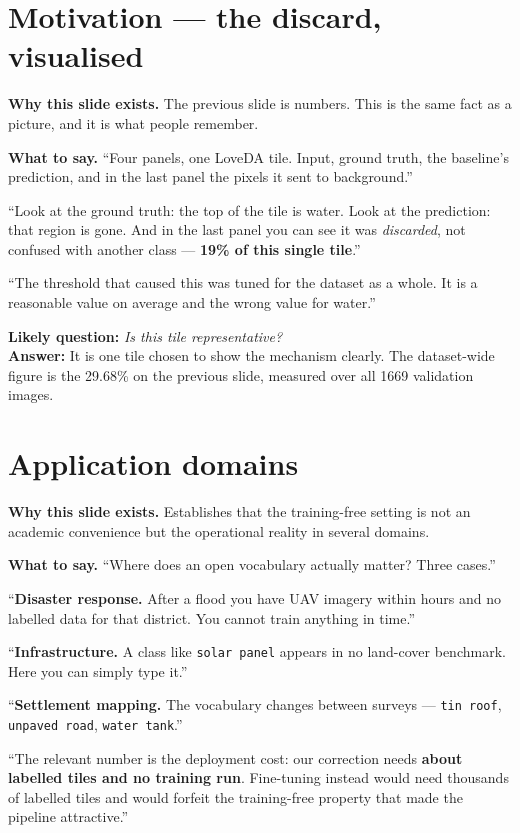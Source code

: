 \documentclass[11pt,a4paper]{article}
\newcommand{\best}[1]{\textcolor{acc}{\textbf{#1}}}
\newcommand{\why}[1]{\par\smallskip\noindent\textbf{Why this slide exists.} #1}
\newcommand{\say}[1]{\par\smallskip\noindent\textbf{What to say.} #1}
\newcommand{\ask}[2]{\par\smallskip\noindent\textbf{Likely question:} \emph{#1}\\
  \textbf{Answer:} #2}
\begin{document}
\section{Motivation --- the discard, visualised}
\why{The previous slide is numbers. This is the same fact as a picture, and it is
what people remember.}

\say{``Four panels, one LoveDA tile. Input, ground truth, the baseline's
prediction, and in the last panel the pixels it sent to background.''

\smallskip
``Look at the ground truth: the top of the tile is water. Look at the
prediction: that region is gone. And in the last panel you can see it was
\emph{discarded}, not confused with another class --- \best{19\% of this single
tile}.''

\smallskip
``The threshold that caused this was tuned for the dataset as a whole. It is a
reasonable value on average and the wrong value for water.''}

\ask{Is this tile representative?}{It is one tile chosen to show the mechanism
clearly. The dataset-wide figure is the 29.68\% on the previous slide, measured
over all 1669 validation images.}

\section{Application domains}
\why{Establishes that the training-free setting is not an academic convenience
but the operational reality in several domains.}

\say{``Where does an open vocabulary actually matter? Three cases.''

\smallskip
``\textbf{Disaster response.} After a flood you have UAV imagery within hours and
no labelled data for that district. You cannot train anything in time.''

\smallskip
``\textbf{Infrastructure.} A class like \texttt{solar panel} appears in no
land-cover benchmark. Here you can simply type it.''

\smallskip
``\textbf{Settlement mapping.} The vocabulary changes between surveys ---
\texttt{tin roof}, \texttt{unpaved road}, \texttt{water tank}.''

\smallskip
``The relevant number is the deployment cost: our correction needs
\best{about \calibTiles{} labelled tiles and no training run}. Fine-tuning
instead would need thousands of labelled tiles and would forfeit the
training-free property that made the pipeline attractive.''}
\end{document}
